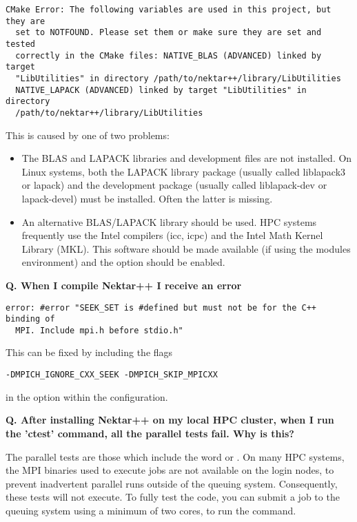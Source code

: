\begin{lstlisting}[style=BashInputStyle]
  CMake Error: The following variables are used in this project, but they are
  set to NOTFOUND. Please set them or make sure they are set and tested
  correctly in the CMake files: NATIVE_BLAS (ADVANCED) linked by target
  "LibUtilities" in directory /path/to/nektar++/library/LibUtilities
  NATIVE_LAPACK (ADVANCED) linked by target "LibUtilities" in directory
  /path/to/nektar++/library/LibUtilities
\end{lstlisting}

This is caused by one of two problems:
\begin{itemize}
  \item The BLAS and LAPACK libraries and development files are not installed.
  On Linux systems, both the LAPACK library package (usually called liblapack3
  or lapack) and the development package (usually called liblapack-dev or
  lapack-devel) must be installed. Often the latter is missing.
  \item An alternative BLAS/LAPACK library should be used. HPC systems
  frequently use the Intel compilers (icc, icpc) and the Intel Math Kernel
  Library (MKL). This software should be made available (if using the modules
  environment) and the option  should be enabled.
\end{itemize}

\textbf{Q. When I compile Nektar++ I receive an error}
\begin{lstlisting}[style=BashInputStyle]
  error: #error "SEEK_SET is #defined but must not be for the C++ binding of
  MPI. Include mpi.h before stdio.h"
\end{lstlisting}

This can be fixed by including the flags
\begin{lstlisting}[style=BashInputStyle]
  -DMPICH_IGNORE_CXX_SEEK -DMPICH_SKIP_MPICXX
\end{lstlisting}
in the  option within the  configuration.

\textbf{Q. After installing Nektar++ on my local HPC cluster, when I run the
  'ctest' command, all the parallel tests fail. Why is this?}

The parallel tests are those which include the word  or
. On many HPC systems, the MPI binaries used to execute jobs are not
available on the login nodes, to prevent inadvertent parallel runs outside of
the queuing system. Consequently, these tests will not execute. To fully test
the code, you can submit a job to the queuing system using a minimum of two
cores, to run the  command.

